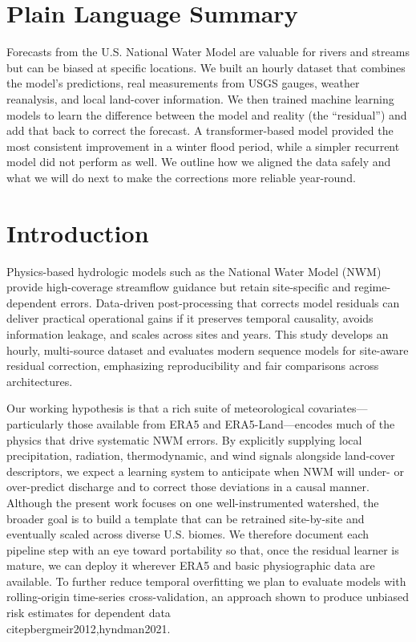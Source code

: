\documentclass[draft]{agujournal2019}
\begin{document}
\section*{Plain Language Summary}
Forecasts from the U.S. National Water Model are valuable for rivers and streams but can be biased at specific locations. We built an hourly dataset that combines the model’s predictions, real measurements from USGS gauges, weather reanalysis, and local land-cover information. We then trained machine learning models to learn the difference between the model and reality (the “residual”) and add that back to correct the forecast. A transformer-based model provided the most consistent improvement in a winter flood period, while a simpler recurrent model did not perform as well. We outline how we aligned the data safely and what we will do next to make the corrections more reliable year-round.

\section{Introduction}
Physics-based hydrologic models such as the National Water Model (NWM) provide high-coverage streamflow guidance but retain site-specific and regime-dependent errors. Data-driven post-processing that corrects model residuals can deliver practical operational gains if it preserves temporal causality, avoids information leakage, and scales across sites and years. This study develops an hourly, multi-source dataset and evaluates modern sequence models for site-aware residual correction, emphasizing reproducibility and fair comparisons across architectures.

Our working hypothesis is that a rich suite of meteorological covariates—particularly those available from ERA5 and ERA5-Land—encodes much of the physics that drive systematic NWM errors. By explicitly supplying local precipitation, radiation, thermodynamic, and wind signals alongside land-cover descriptors, we expect a learning system to anticipate when NWM will under- or over-predict discharge and to correct those deviations in a causal manner. Although the present work focuses on one well-instrumented watershed, the broader goal is to build a template that can be retrained site-by-site and eventually scaled across diverse U.S. biomes. We therefore document each pipeline step with an eye toward portability so that, once the residual learner is mature, we can deploy it wherever ERA5 and basic physiographic data are available. To further reduce temporal overfitting we plan to evaluate models with rolling-origin time-series cross-validation, an approach shown to produce unbiased risk estimates for dependent data \\citep{bergmeir2012,hyndman2021}.
\end{document}
